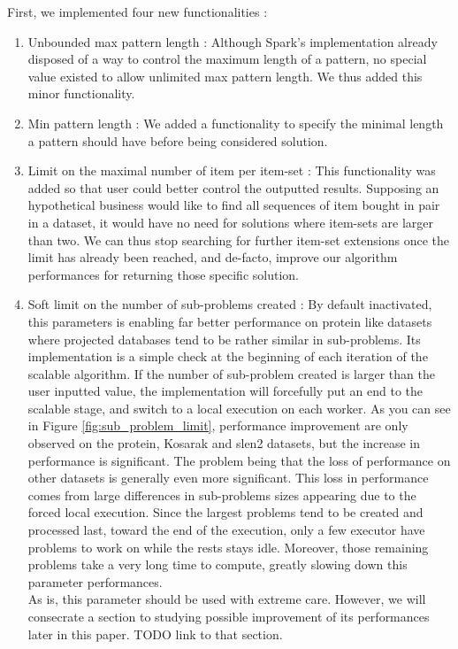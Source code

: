 \documentclass{eplmastersthesis}
\begin{document}
First, we implemented four new functionalities :
\begin{enumerate}
	\item Unbounded max pattern length : Although Spark's implementation already disposed of a way to control the maximum length of a pattern, no special value existed to allow unlimited max pattern length. We thus added this minor functionality.
	\item Min pattern length : We added a functionality to specify the minimal length a pattern should have before being considered solution.
	\item Limit on the maximal number of item per item-set : This functionality was added so that user could better control the outputted results. Supposing an hypothetical business would like to find all sequences of item bought in pair in a dataset, it would have no need for solutions where item-sets are larger than two. We can thus stop searching for further item-set extensions once the limit has already been reached, and de-facto, improve our algorithm performances for returning those specific solution.
	\item Soft limit on the number of sub-problems created : By default inactivated, this parameters is enabling far better performance on protein like datasets where projected databases tend to be rather similar in sub-problems. Its implementation is a simple check at the beginning of each iteration of the scalable algorithm. If the number of sub-problem created is larger than the user inputted value, the implementation will forcefully put an end to the scalable stage, and switch to a local execution on each worker.\newline
	 As you can see in Figure \ref{fig:sub_problem_limit}, performance improvement are only observed on the protein, Kosarak and slen2 datasets, but the increase in performance is significant. The problem being that the loss of performance on other datasets is generally even more significant. This loss in performance comes from large differences in sub-problems sizes appearing due to the forced local execution. Since the largest problems tend to be created and processed last, toward the end of the execution, only a few executor have problems to work on while the rests stays idle. Moreover, those remaining problems take a very long time to compute, greatly slowing down this parameter performances. \\
	 As is, this parameter should be used with extreme care. However, we will consecrate a section to studying possible improvement of its performances later in this paper. TODO link to that section.
\end{enumerate}
\end{document}
